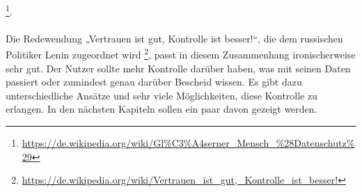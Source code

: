 \footnote{\url{https://de.wikipedia.org/wiki/Gl\%C3\%A4serner_Mensch_\%28Datenschutz\%29}}.
\\
\\
Die Redewendung „Vertrauen ist gut, Kontrolle ist besser!“, die dem russischen Politiker Lenin zugeordnet wird
\footnote{\url{https://de.wikipedia.org/wiki/Vertrauen_ist_gut,_Kontrolle_ist_besser!}}, passt in diesem Zusammenhang ironischerweise sehr gut. Der Nutzer sollte mehr Kontrolle darüber haben, was mit seinen Daten passiert oder zumindest genau darüber Bescheid wissen. Es gibt dazu unterschiedliche Ansätze und sehr viele Möglichkeiten, diese Kontrolle zu erlangen. In den nächsten Kapiteln sollen ein paar davon gezeigt werden.

